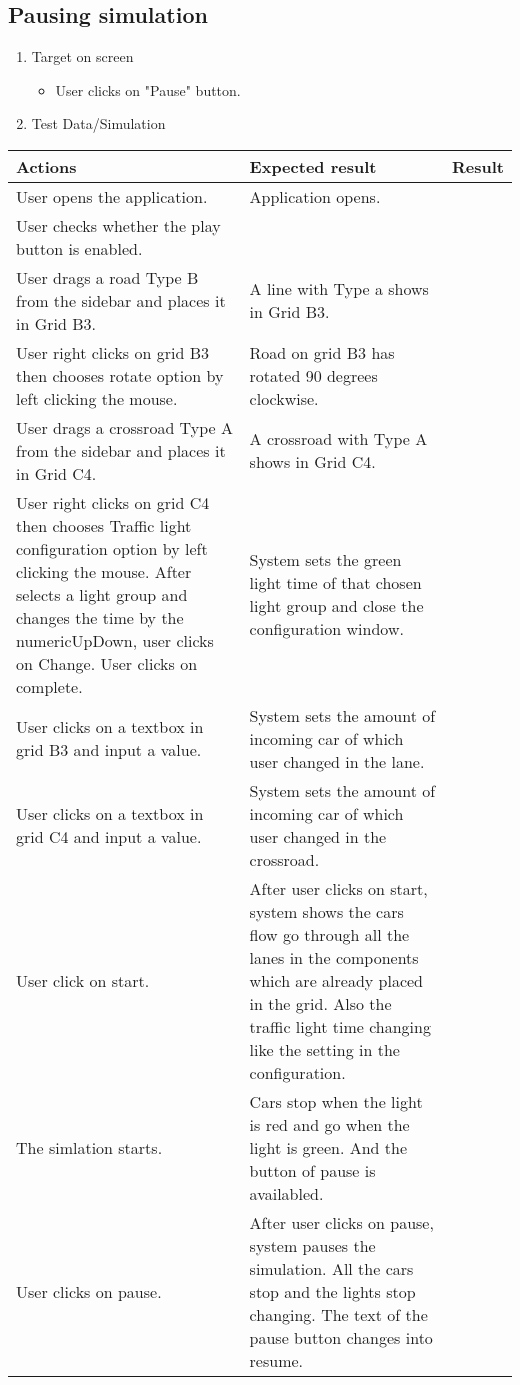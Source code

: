 \newpage

\subsection{Pausing  simulation}

\begin{enumerate}

	\item Target on screen
	\begin{itemize}
		\item User clicks on "Pause" button.
	\end{itemize}
	\item Test Data/Simulation
\end{enumerate}
	\begin{tabularx}{\textwidth}{|X|X|p{2.5cm}|}\hline
		Actions & Expected result & Result \\\hline
		User opens the application.& Application opens. &  \pass \\\hline
		User checks whether the play button is enabled. & &  \pass \\\hline
		User drags a road Type B from the sidebar and places it in Grid B3. & A line with Type a shows in Grid B3. & \pass \\\hline
		User right clicks on grid B3 then chooses rotate option by left clicking the mouse. & Road on grid B3 has rotated 90 degrees clockwise. & \pass \\\hline
		User drags a crossroad Type A from the sidebar and places it in Grid C4. & A crossroad with Type A shows in Grid C4. & \pass \\\hline
		User right clicks on grid C4 then chooses Traffic light configuration  option by left clicking the mouse. After selects a light group and changes the time by the numericUpDown, user clicks on Change. User clicks on complete. & System sets the green light time of that chosen light group and close the configuration window.  & \pass \\\hline
		User clicks on a textbox in grid B3 and input a value. & System sets the amount of incoming car of which user changed in the lane. & \pass \\\hline
		User clicks on a textbox in grid C4 and input a value. & System sets the amount of incoming car of which user changed in the crossroad. & \pass \\\hline
		User click on start. & After user clicks on start, system shows the cars flow go through all the lanes in the components which are already placed in the grid. Also the traffic light time changing like the setting in the configuration. & \pass \\\hline
		The simlation starts. &	Cars stop when the light is red and go when the light is green. And the button of pause is availabled. & \pass \\\hline	
		User clicks on pause. & After user clicks on pause, system pauses the simulation. All the cars stop and the lights stop changing. The text of the pause button changes into resume. & \pass \\\hline
	\end{tabularx}

